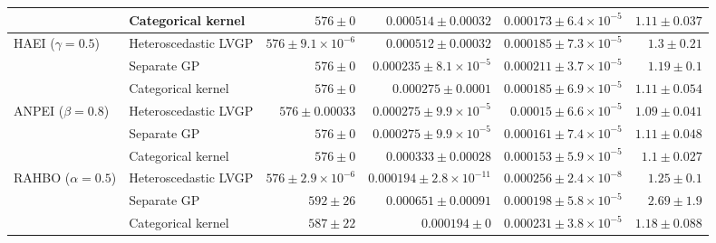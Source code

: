 \begin{table}[htbp]
\begin{tabular}{llrrrr}
 & Categorical kernel & \colorbox{green!20}{{\boldmath$576 \pm 0$}} & $0.000514 \pm 0.00032$ & {\boldmath$0.000173 \pm 6.4{\times}10^{-5}$} & {\boldmath$1.11 \pm 0.037$} \\
\midrule
HAEI ($\gamma=0.5$) & Heteroscedastic LVGP & $576 \pm 9.1{\times}10^{-6}$ & $0.000512 \pm 0.00032$ & $0.000185 \pm 7.3{\times}10^{-5}$ & $1.3 \pm 0.21$ \\
 & Separate GP & \colorbox{green!20}{{\boldmath$576 \pm 0$}} & {\boldmath$0.000235 \pm 8.1{\times}10^{-5}$} & $0.000211 \pm 3.7{\times}10^{-5}$ & $1.19 \pm 0.1$ \\
 & Categorical kernel & \colorbox{green!20}{{\boldmath$576 \pm 0$}} & $0.000275 \pm 0.0001$ & {\boldmath$0.000185 \pm 6.9{\times}10^{-5}$} & {\boldmath$1.11 \pm 0.054$} \\
\midrule
ANPEI ($\beta=0.8$) & Heteroscedastic LVGP & $576 \pm 0.00033$ & $0.000275 \pm 9.9{\times}10^{-5}$ & \colorbox{green!20}{{\boldmath$0.00015 \pm 6.6{\times}10^{-5}$}} & \colorbox{green!20}{{\boldmath$1.09 \pm 0.041$}} \\
 & Separate GP & \colorbox{green!20}{{\boldmath$576 \pm 0$}} & {\boldmath$0.000275 \pm 9.9{\times}10^{-5}$} & $0.000161 \pm 7.4{\times}10^{-5}$ & $1.11 \pm 0.048$ \\
 & Categorical kernel & \colorbox{green!20}{{\boldmath$576 \pm 0$}} & $0.000333 \pm 0.00028$ & $0.000153 \pm 5.9{\times}10^{-5}$ & $1.1 \pm 0.027$ \\
\midrule
RAHBO ($\alpha=0.5$) & Heteroscedastic LVGP & {\boldmath$576 \pm 2.9{\times}10^{-6}$} & $0.000194 \pm 2.8{\times}10^{-11}$ & $0.000256 \pm 2.4{\times}10^{-8}$ & $1.25 \pm 0.1$ \\
 & Separate GP & $592 \pm 26$ & $0.000651 \pm 0.00091$ & {\boldmath$0.000198 \pm 5.8{\times}10^{-5}$} & $2.69 \pm 1.9$ \\
 & Categorical kernel & $587 \pm 22$ & \colorbox{green!20}{{\boldmath$0.000194 \pm 0$}} & $0.000231 \pm 3.8{\times}10^{-5}$ & {\boldmath$1.18 \pm 0.088$} \\
\bottomrule
\end{tabular}
\end{table}

